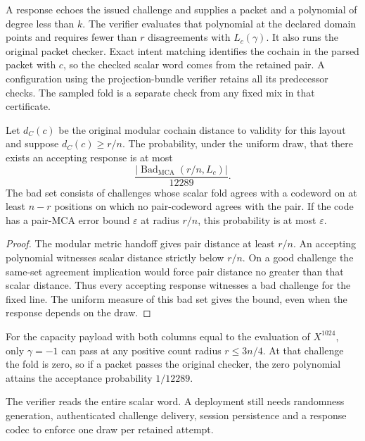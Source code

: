 A response echoes the issued challenge and supplies a packet and a polynomial
of degree less than \(k\). The verifier evaluates that polynomial at the
declared domain points and requires fewer than \(r\) disagreements with
\(L_c(\gamma)\). It also runs the original packet checker. Exact intent
matching identifies the cochain in the parsed packet with \(c\), so the
checked scalar word comes from the retained pair. A configuration using the
projection-bundle verifier retains all its predecessor checks. The sampled
fold is a separate check from any fixed mix in that certificate.

\begin{proposition}
\label{prop:sampled-mca}
Let \(d_C(c)\) be the original modular cochain distance to validity for this
layout and suppose \(d_C(c)\ge r/n\). The probability, under the uniform draw,
that there exists an accepting response is at most
\[
  \frac{\bigl|\operatorname{Bad}_{\mathrm{MCA}}(r/n,L_c)\bigr|}{12289}.
\]
The bad set consists of challenges whose scalar fold agrees with a codeword
on at least \(n-r\) positions on which no pair-codeword agrees with the
pair. If the code has a pair-MCA error bound
\(\varepsilon\) at radius \(r/n\), this probability is at most
\(\varepsilon\).
\end{proposition}

\begin{proof}
The modular metric handoff gives pair distance at least \(r/n\).
An accepting polynomial witnesses scalar distance strictly below \(r/n\).
On a good challenge the same-set agreement implication would force pair
distance no greater than that scalar distance. Thus every accepting
response witnesses a bad challenge for the fixed line. The uniform measure
of this bad set gives the bound, even when the response depends on the draw.
\end{proof}

For the capacity payload with both columns equal to the evaluation of
\(X^{1024}\), only \(\gamma=-1\) can pass at any positive count radius
\(r\le 3n/4\). At that challenge the fold is zero, so if a packet passes
the original checker, the zero polynomial attains the
acceptance probability \(1/12289\).

The verifier reads the entire scalar word. A deployment still needs randomness
generation, authenticated challenge delivery, session persistence and a
response codec to enforce one draw per retained attempt.



